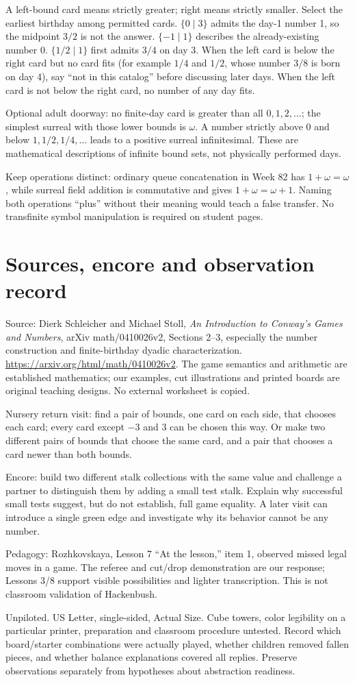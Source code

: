 \documentclass[11pt,letterpaper]{article}
\begin{document}
A left-bound card means strictly greater; right means strictly smaller. Select the earliest birthday among permitted cards. $\{0\mid3\}$ admits the day-1 number 1, so the midpoint $3/2$ is not the answer. $\{-1\mid1\}$ describes the already-existing number 0. $\{1/2\mid1\}$ first admits $3/4$ on day 3. When the left card is below the right card but no card fits (for example $1/4$ and $1/2$, whose number $3/8$ is born on day 4), say ``not in this catalog'' before discussing later days. When the left card is not below the right card, no number of any day fits.

Optional adult doorway: no finite-day card is greater than all $0,1,2,\ldots$; the simplest surreal with those lower bounds is $\omega$. A number strictly above 0 and below $1,1/2,1/4,\ldots$ leads to a positive surreal infinitesimal. These are mathematical descriptions of infinite bound sets, not physically performed days.

Keep operations distinct: ordinary queue concatenation in Week 82 has $1+\omega=\omega$, while surreal field addition is commutative and gives $1+\omega=\omega+1$. Naming both operations ``plus'' without their meaning would teach a false transfer. No transfinite symbol manipulation is required on student pages.
\newpage
\section*{Sources, encore and observation record}
Source: Dierk Schleicher and Michael Stoll, \emph{An Introduction to Conway's Games and Numbers}, arXiv math/0410026v2, Sections 2--3, especially the number construction and finite-birthday dyadic characterization. \url{https://arxiv.org/html/math/0410026v2}. The game semantics and arithmetic are established mathematics; our examples, cut illustrations and printed boards are original teaching designs. No external worksheet is copied.

Nursery return visit: find a pair of bounds, one card on each side, that chooses each card; every card except $-3$ and $3$ can be chosen this way. Or make two different pairs of bounds that choose the same card, and a pair that chooses a card newer than both bounds.

Encore: build two different stalk collections with the same value and challenge a partner to distinguish them by adding a small test stalk. Explain why successful small tests suggest, but do not establish, full game equality. A later visit can introduce a single green edge and investigate why its behavior cannot be any number.

Pedagogy: Rozhkovskaya, Lesson 7 ``At the lesson,'' item 1, observed missed legal moves in a game. The referee and cut/drop demonstration are our response; Lessons 3/8 support visible possibilities and lighter transcription. This is not classroom validation of Hackenbush.

Unpiloted. US Letter, single-sided, Actual Size. Cube towers, color legibility on a particular printer, preparation and classroom procedure untested. Record which board/starter combinations were actually played, whether children removed fallen pieces, and whether balance explanations covered all replies. Preserve observations separately from hypotheses about abstraction readiness.
\end{document}
